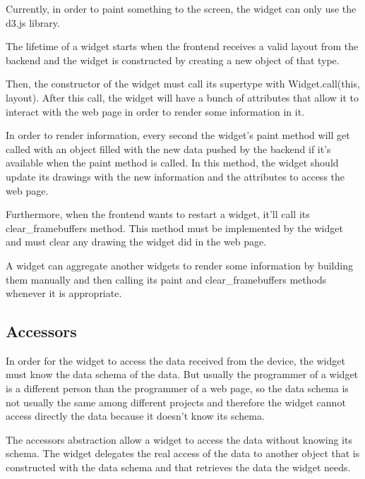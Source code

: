 \documentclass[12pt]{article}
\begin{document}
            Currently, in order to paint something to the screen, the widget can
            only use the d3.js library.

            The lifetime of a widget starts when the frontend receives a valid
            layout from the backend and the widget is constructed by creating a
            new object of that type.
            
            Then, the constructor of the widget must call its supertype with
            Widget.call(this, layout). After this call, the widget will have a
            bunch of attributes that allow it to interact with the web page in
            order to render some information in it.

            In order to render information, every second the widget's paint
            method will get called with an object filled with the new data
            pushed by the backend if it's available when the paint method is
            called. In this method, the widget should update its drawings with
            the new information and the attributes to access the web page.

            Furthermore, when the frontend wants to restart a widget, it'll
            call its clear\_framebuffers method. This method must be implemented
            by the widget and must clear any drawing the widget did in the web
            page.

            A widget can aggregate another widgets to render some information by
            building them manually and then calling its paint and
            clear\_framebuffers methods whenever it is appropriate.

        \subsection{Accessors}
            In order for the widget to access the data received from the device,
            the widget must know the data schema of the data. But usually the
            programmer of a widget is a different person than the programmer of
            a web page, so the data schema is not usually the same among
            different projects and therefore the widget cannot access directly
            the data because it doesn't know its schema.

            The accessors abstraction allow a widget to access the data without
            knowing its schema. The widget delegates the real access of the data
            to another object that is constructed with the data schema and that
            retrieves the data the widget needs.
\end{document}
